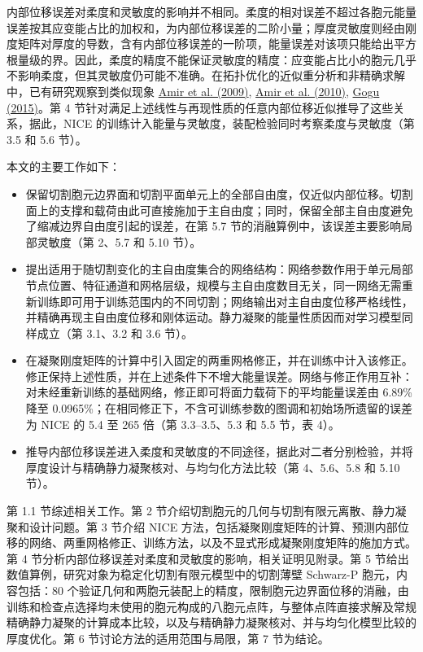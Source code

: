 \documentclass[preprint,12pt,authoryear]{elsarticle}
\providecommand{\tightlist}{\setlength{\itemsep}{0pt}\setlength{\parskip}{0pt}}
\begin{document}
内部位移误差对柔度和灵敏度的影响并不相同。柔度的相对误差不超过各胞元能量误差按其应变能占比的加权和，为内部位移误差的二阶小量；厚度灵敏度则经由刚度矩阵对厚度的导数，含有内部位移误差的一阶项，能量误差对该项只能给出平方根量级的界。因此，柔度的精度不能保证灵敏度的精度：应变能占比小的胞元几乎不影响柔度，但其灵敏度仍可能不准确。在拓扑优化的近似重分析和非精确求解中，已有研究观察到类似现象 \href{https://doi.org/10.1002/nme.2536}{Amir et al. (2009)}, \href{https://doi.org/10.1007/s00158-009-0463-4}{Amir et al. (2010)}, \href{https://doi.org/10.1002/nme.4797}{Gogu (2015)}。第 4 节针对满足上述线性与再现性质的任意内部位移近似推导了这些关系，据此，NICE 的训练计入能量与灵敏度，装配检验同时考察柔度与灵敏度（第 3.5 和 5.6 节）。

本文的主要工作如下：

\begin{itemize}
\tightlist
\item
  保留切割胞元边界面和切割平面单元上的全部自由度，仅近似内部位移。切割面上的支撑和载荷由此可直接施加于主自由度；同时，保留全部主自由度避免了缩减边界自由度引起的误差，在第 5.7 节的消融算例中，该误差主要影响局部灵敏度（第 2、5.7 和 5.10 节）。
\item
  提出适用于随切割变化的主自由度集合的网络结构：网络参数作用于单元局部节点位置、特征通道和网格层级，规模与主自由度数目无关，同一网络无需重新训练即可用于训练范围内的不同切割；网络输出对主自由度位移严格线性，并精确再现主自由度位移和刚体运动。静力凝聚的能量性质因而对学习模型同样成立（第 3.1、3.2 和 3.6 节）。
\item
  在凝聚刚度矩阵的计算中引入固定的两重网格修正，并在训练中计入该修正。修正保持上述性质，并在上述条件下不增大能量误差。网络与修正作用互补：对未经重新训练的基础网络，修正即可将面力载荷下的平均能量误差由 6.89\% 降至 0.0965\%；在相同修正下，不含可训练参数的图调和初始场所遗留的误差为 NICE 的 5.4 至 265 倍（第 3.3--3.5、5.3 和 5.5 节，表 4）。
\item
  推导内部位移误差进入柔度和灵敏度的不同途径，据此对二者分别检验，并将厚度设计与精确静力凝聚核对、与均匀化方法比较（第 4、5.6、5.8 和 5.10 节）。
\end{itemize}

第 1.1 节综述相关工作。第 2 节介绍切割胞元的几何与切割有限元离散、静力凝聚和设计问题。第 3 节介绍 NICE 方法，包括凝聚刚度矩阵的计算、预测内部位移的网络、两重网格修正、训练方法，以及不显式形成凝聚刚度矩阵的施加方式。第 4 节分析内部位移误差对柔度和灵敏度的影响，相关证明见附录。第 5 节给出数值算例，研究对象为稳定化切割有限元模型中的切割薄壁 Schwarz-P 胞元，内容包括：80 个验证几何和两胞元装配上的精度，限制胞元边界面位移的消融，由训练和检查点选择均未使用的胞元构成的八胞元点阵，与整体点阵直接求解及常规精确静力凝聚的计算成本比较，以及与精确静力凝聚核对、并与均匀化模型比较的厚度优化。第 6 节讨论方法的适用范围与局限，第 7 节为结论。
\end{document}
